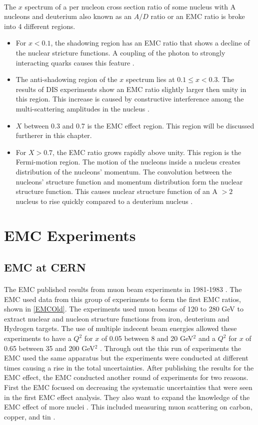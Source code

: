\paragraph{}The $x$ spectrum of a per nucleon cross section ratio of some nucleus with A nucleons and deuterium also known as an $A/D$ ratio or an EMC ratio is broke into 4 different regions. 
\begin{itemize}
	\item For $x < 0.1$, the shadowing region has an EMC ratio that shows a decline of the nuclear stricture functions. A coupling of the photon to strongly interacting quarks causes this feature \cite{PnN}.
	\item The anti-shadowing region of the $x$ spectrum lies at $0.1 \leq x < 0.3 $. The results of DIS experiments show an EMC ratio slightly larger then unity in this region. This increase is caused by constructive interference among the multi-scattering amplitudes in the nucleus \cite{shadowing}.
	\item $X$ between 0.3 and 0.7 is the EMC effect region. This region will be discussed furtherer in this chapter.
	\item For $X > 0.7$, the EMC ratio grows rapidly above unity.  This region is the Fermi-motion region. The  motion of the nucleons inside a nucleus creates distribution of the nucleons'  momentum. The convolution between the nucleons' structure function and momentum distribution form the nuclear structure function. This causes nuclear structure function of an A $> 2$ nucleus to rise quickly compared to a deuterium nucleus \cite{Ajth,PnN}. 
\end{itemize}
\section{EMC Experiments}
\subsection{EMC at CERN}
\paragraph{} The EMC published results from muon beam experiments in 1981-1983 \cite{EM,EMC_iron,CERN_EMC,EMC_F2d}.  The EMC used data from this group of experiments to form the first EMC ratios, shown in \ref{EMCOld}. The experiments used muon beams of 120 to 280 GeV to extract nuclear and nucleon structure functions from iron, deuterium and Hydrogen targets. The use of multiple indecent beam energies allowed these experiments to have a $Q^2$ for $x$ of 0.05 between 8 and 20 GeV$^2$ and a $Q^2$ for $x$ of 0.65 between 35 and 200 GeV$^2$ \cite{CERN_EMC}. Through out the this run of experiments the EMC used the same apparatus but the experiments were conducted at different times causing a rise in the total uncertainties. After publishing the results for the EMC effect, the EMC conducted another round of experiments for two reasons. First the EMC focused on decreasing the systematic uncertainties that were seen in the first EMC effect analysis. They also want to expand the knowledge of the EMC effect of more nuclei \cite{EMC_ext, Ajth}. This included measuring muon scattering on carbon, copper, and tin \cite{EMC_ext}.

